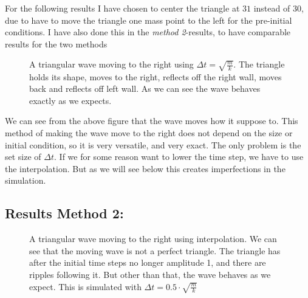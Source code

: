 \documentclass[a4paper,norsk, 10pt]{article}
\begin{document}
For the following results I have chosen to center the triangle at $31$ instead of $30$, due to have to move the triangle one mass point to the left for the pre-initial conditions. I have also done this in the \textit{method 2}-results, to have comparable results for the two methods

\begin{figure}[H]
\captionsetup[subfigure]{position=b}
\centering
{}
\par
{}
\caption{A triangular wave moving to the right using $\Delta t = \sqrt{\frac{m}{k}}$. The triangle holds its shape, moves to the right, reflects off the right wall, moves back and reflects off left wall. As we can see the wave behaves exactly as we expects.}
\end{figure}

We can see from the above figure that the wave moves how it suppose to. This method of making the wave move to the right does not depend on the size or initial condition, so it is very versatile, and very exact. The only problem is the set size of $\Delta t$. If we for some reason want to lower the time step, we have to use the interpolation. But as we will see below this creates imperfections in the simulation.

\subsection*{Results Method 2:}


\begin{figure}[H]
\captionsetup[subfigure]{position=b}
\centering
{}
\par
{}
\caption{A triangular wave moving to the right using interpolation. We can see that the moving wave is not a perfect triangle. The triangle has after the initial time steps no longer amplitude 1, and there are ripples following it. But other than that, the wave behaves as we expect. This is simulated with $\Delta t = 0.5\cdot \sqrt{\frac{m}{k}}$}
\end{figure}
\end{document}
